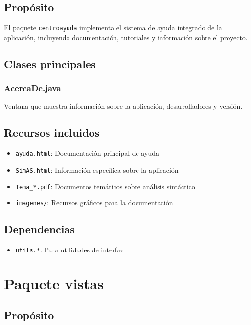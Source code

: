 \subsection{Propósito}

El paquete \texttt{centroayuda} implementa el sistema de ayuda integrado de la aplicación, incluyendo documentación, tutoriales y información sobre el proyecto.

\subsection{Clases principales}

\subsubsection{AcercaDe.java}

Ventana que muestra información sobre la aplicación, desarrolladores y versión.

\subsection{Recursos incluidos}

\begin{itemize}
    \item \texttt{ayuda.html}: Documentación principal de ayuda
    \item \texttt{SimAS.html}: Información específica sobre la aplicación
    \item \texttt{Tema\_*.pdf}: Documentos temáticos sobre análisis sintáctico
    \item \texttt{imagenes/}: Recursos gráficos para la documentación
\end{itemize}

\subsection{Dependencias}

\begin{itemize}
    \item \texttt{utils.*}: Para utilidades de interfaz
\end{itemize}

\section{Paquete vistas}

\subsection{Propósito}


